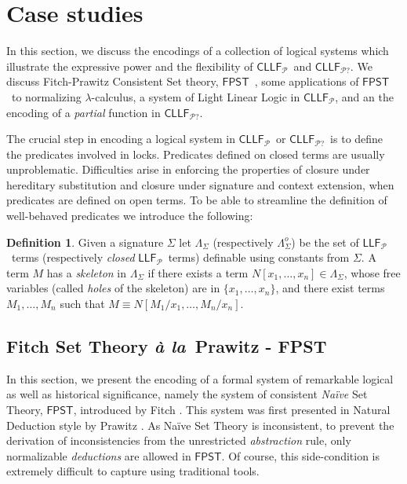 \documentclass[submission,copyright,creativecommons]{eptcs}
\theoremstyle{plain}
\theoremstyle{definition}
\newtheorem{definition}{Definition}[section]
\newcommand{\LLFP}  {\mbox{$\mathsf{LLF}_{\mathcal P}$}}
\newcommand{\CLLFP} {\mbox{$\mathsf{CLLF}_{\mathcal P}$}}
\newcommand{\CLLFPQ} {\mbox{$\mathsf{CLLF}_{\mathcal P?}$}}
\newcommand{\FPST}   {\mbox{$\mathsf{FPST}$}}
\newcommand {\ala}       {{\textit{\`a la}}}
\begin{document}
\section{Case studies}\label{sec:case_studies}
In this section, we discuss the encodings of a collection of logical
systems which illustrate the expressive power and the flexibility of
\CLLFP\ and \CLLFPQ. We discuss Fitch-Prawitz Consistent Set theory,
\FPST\ \cite{prawitz}, some applications of \FPST\ to normalizing
$\lambda$-calculus, a system of Light Linear Logic in \CLLFP, and an
the encoding of a \emph{partial} function in \CLLFPQ.

The crucial step in encoding a logical system in \CLLFP\ or \CLLFPQ\
is to define the predicates involved in locks. Predicates defined on
closed terms are usually unproblematic. Difficulties arise in
enforcing the properties of closure under hereditary substitution and
closure under signature and context extension, when predicates are
defined on open terms.  To be able to streamline the definition of
well-behaved predicates we introduce the following:
\begin{definition}
  Given a signature $\Sigma$ let $\Lambda_\Sigma$ (respectively
  $\Lambda_\Sigma^o$) be the set of \LLFP\ terms (respectively
  \emph{closed} \LLFP\ terms) definable using constants from
  $\Sigma$. A term $M$ has a \emph{skeleton} in $\Lambda_\Sigma$ if
  there exists a term $N[x_1, \ldots, x_n]\in \Lambda_\Sigma$, whose
  free variables (called \emph{holes} of the skeleton) are in
  $\{x_1,\ldots, x_n\}$, and there exist terms $M_1,\ldots, M_n$ such
  that $M \equiv N[M_1/x_1, \ldots,M_n/x_n]$.
\end{definition}

\subsection{Fitch Set Theory \ala\ Prawitz - {\sf FPST}} \label{Fitch}
In this section, we present the encoding of a formal system of
remarkable logical as well as historical significance, namely the
system of consistent {\emph{Na\"ive} Set Theory}, \FPST, introduced by
Fitch \cite{fitch}. This system was first presented in Natural
Deduction style by Prawitz \cite{prawitz}. As Na\"ive Set Theory is
inconsistent, to prevent the derivation of inconsistencies from the
unrestricted \emph{abstraction} rule, only normalizable
\emph{deductions} are allowed in \FPST. Of course, this side-condition
is extremely difficult to capture using traditional tools.
\end{document}
